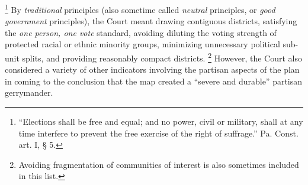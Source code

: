         \footnote{``Elections shall be free and equal; and no power, civil or military, shall at any time interfere to prevent the free exercise of the right of suffrage.'' Pa. Const. art. I, § 5.}
    By \textit{traditional} principles (also sometime called \textit{neutral} principles, or \textit{good government} principles), the Court meant drawing contiguous districts, satisfying the \textit{one person, one vote} standard, avoiding diluting the voting strength of protected racial or ethnic minority groups, minimizing unnecessary political sub-unit splits, and providing reasonably compact districts.
        \footnote{Avoiding fragmentation of communities of interest is also sometimes included in this list.}
    However, the Court also considered a variety of other indicators involving the partisan aspects of the plan in coming to the conclusion that the map created a ``severe and durable'' partisan gerrymander.

